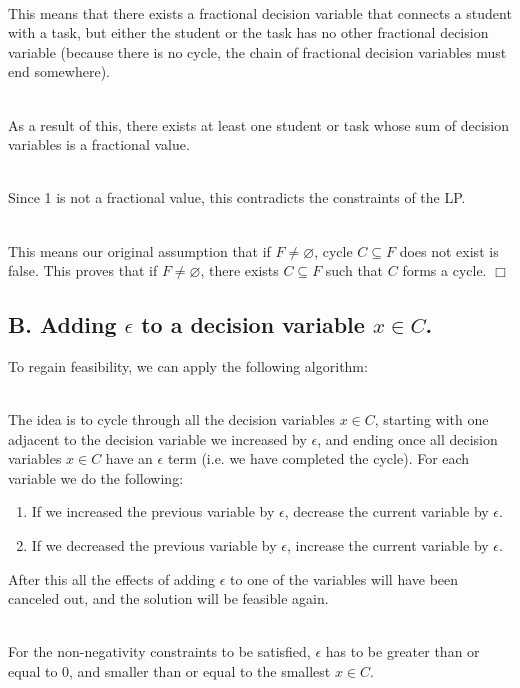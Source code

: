 \documentclass[12pt]{article}
\begin{document}
\noindent
\\
This means that there exists a fractional decision variable that connects a student with a task, but either the student or the task has no other fractional decision variable (because there is no cycle, the chain of fractional decision variables must end somewhere).

\noindent
\\
As a result of this, there exists at least one student or task whose sum of decision variables is a fractional value.

\noindent
\\
Since 1 is not a fractional value, this contradicts the constraints of the LP.

\noindent
\\
This means our original assumption that if $F \neq \varnothing$, cycle $C \subseteq F$ does not exist is false.
This proves that if $F \neq \varnothing$, there exists $C \subseteq F$ such that $C$ forms a cycle. $\Box$

\subsection{B. Adding $\epsilon$ to a decision variable $x \in C$.}
To regain feasibility, we can apply the following algorithm:

\noindent
\\
The idea is to cycle through all the decision variables $x \in C$, starting with one adjacent to the decision variable we increased by $\epsilon$, and ending once all decision variables $x \in C$ have an $\epsilon$ term (i.e. we have completed the cycle).
For each variable we do the following:

\begin{enumerate}
  \item If we increased the previous variable by $\epsilon$, decrease the current variable by $\epsilon$.
  \item If we decreased the previous variable by $\epsilon$, increase the current variable by $\epsilon$.
\end{enumerate}

\noindent
After this all the effects of adding $\epsilon$ to one of the variables will have been canceled out, and the solution will be feasible again.

\noindent
\\
For the non-negativity constraints to be satisfied, $\epsilon$ has to be greater than or equal to 0, and smaller than or equal to the smallest $x \in C$.
\end{document}
